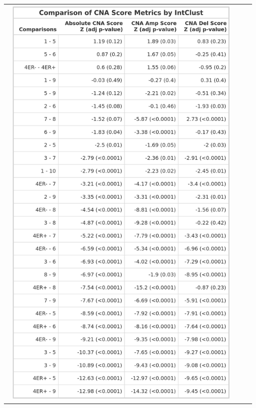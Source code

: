 \begin{table}[!ht]
\begin{minipage}[c]{0.45\textwidth}
\end{minipage}
\hspace{0.8cm}
\begin{minipage}[c]{0.45\textwidth}
\centering
\begin{tabular}{ccc}
\includegraphics[width=0.96\textwidth]{../tables/Chapter_2/Global_CNA_Score_Metric_IntClust_Comparisons_2.png}
\end{tabular}
\end{minipage}
\label{tab:DT_Score_2}
\end{table}

